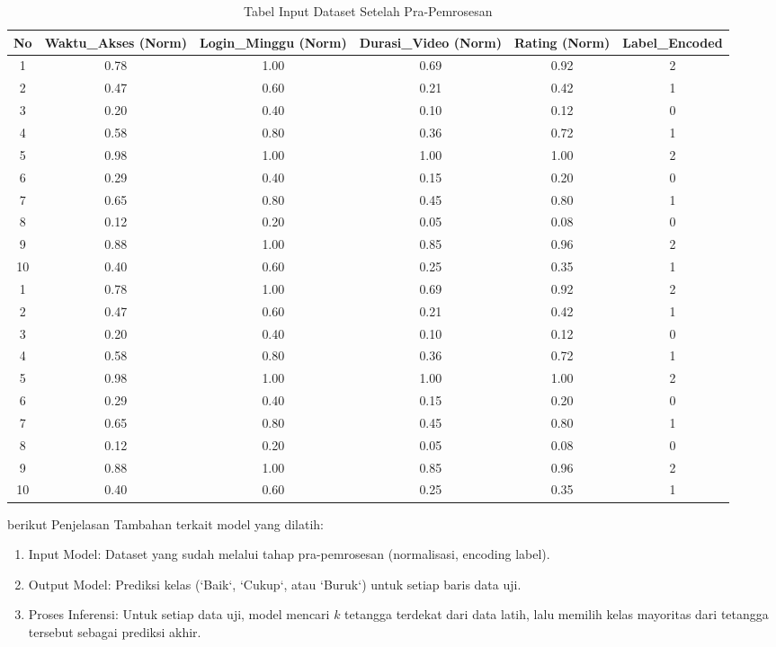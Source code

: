 \begin{table}
\centering
\caption{Tabel Input Dataset Setelah Pra-Pemrosesan}
\label{tab:dataset_normalized}
\begin{tabular}{|c|c|c|c|c|c|}
\hline
No & Waktu\_Akses (Norm) & Login\_Minggu (Norm) & Durasi\_Video (Norm) & Rating (Norm) & Label\_Encoded \\
\hline
1 & 0.78 & 1.00 & 0.69 & 0.92 & 2 \\
2 & 0.47 & 0.60 & 0.21 & 0.42 & 1 \\
3 & 0.20 & 0.40 & 0.10 & 0.12 & 0 \\
4 & 0.58 & 0.80 & 0.36 & 0.72 & 1 \\
5 & 0.98 & 1.00 & 1.00 & 1.00 & 2 \\
6 & 0.29 & 0.40 & 0.15 & 0.20 & 0 \\
7 & 0.65 & 0.80 & 0.45 & 0.80 & 1 \\
8 & 0.12 & 0.20 & 0.05 & 0.08 & 0 \\
9 & 0.88 & 1.00 & 0.85 & 0.96 & 2 \\
10 & 0.40 & 0.60 & 0.25 & 0.35 & 1 \\
1 & 0.78 & 1.00 & 0.69 & 0.92 & 2 \\
2 & 0.47 & 0.60 & 0.21 & 0.42 & 1 \\
3 & 0.20 & 0.40 & 0.10 & 0.12 & 0 \\
4 & 0.58 & 0.80 & 0.36 & 0.72 & 1 \\
5 & 0.98 & 1.00 & 1.00 & 1.00 & 2 \\
6 & 0.29 & 0.40 & 0.15 & 0.20 & 0 \\
7 & 0.65 & 0.80 & 0.45 & 0.80 & 1 \\
8 & 0.12 & 0.20 & 0.05 & 0.08 & 0 \\
9 & 0.88 & 1.00 & 0.85 & 0.96 & 2 \\
10 & 0.40 & 0.60 & 0.25 & 0.35 & 1 \\
\hline
\end{tabular}
\end{table}

\par berikut Penjelasan Tambahan terkait model yang dilatih:
\begin{enumerate}
    \item Input Model: Dataset yang sudah melalui tahap pra-pemrosesan (normalisasi, encoding label).
    \item Output Model: Prediksi kelas (`Baik`, `Cukup`, atau `Buruk`) untuk setiap baris data uji.
    \item Proses Inferensi: Untuk setiap data uji, model mencari $ k $ tetangga terdekat dari data latih, lalu memilih kelas mayoritas dari tetangga tersebut sebagai prediksi akhir.
\end{enumerate}


